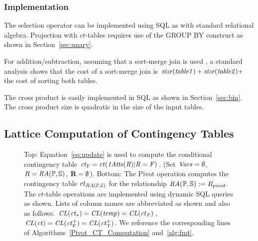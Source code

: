 \documentclass{acm_proc_article-sp}
\newcommand{\ct}{\mathit{ct}}
\begin{document}
\subsubsection{Implementation}\label{sec:imp}


The selection operator can be implemented  using SQL as with standard relational algebra. 
Projection with $\ct$-tables requires use of the GROUP BY construct as shown in Section~\ref{sec:unary}. 

For addition/subtraction, assuming that a sort-merge join is used \cite{Ullman1982}, a standard analysis shows that the cost of a sort-merge join is $\it{size}(table1) + \it{size}(table2) +$ the cost of sorting both tables. 

The cross product is easily implemented in SQL as shown in Section~\ref{sec:bin}. The cross product size is quadratic in the size of the input tables.


\subsection{Lattice Computation of Contingency Tables} \label{sec:mobius}
\begin{figure}[tb]
\begin{center}

\caption{Top: Equation~\eqref{eq:update} is used to compute the conditional contingency table $\ct_{\false} = \ct(\eatts(R)|R = F)$. (Set $\it{Vars} = \emptyset$, $R = \mathit{RA}(\mathbb{P},\mathbb{S})$, $\mathbf{R} = \emptyset$). Bottom: 
The Pivot operation computes the contingency table $\ct_{\ra(\P,\S)}$ for the relationship $\mathit{RA}(\mathbb{P},\mathbb{S}) := R_{pivot}$. The $\ct$-table operations are implemented using dynamic SQL queries as shown. Lists of column names are abbreviated as shown and also as follows.
$\ColumnList({\ct_{*}}) = \ColumnList({temp})=\ColumnList({\ct_{F}})$, 
$\ColumnList({\ct}) =  \ColumnList(\ct_{\false}^{+})  = \ColumnList(\ct_{\true}^{+}) $. We reference the corresponding lines of Algorithms~\ref{Pivot_CT_Computation} and~\ref{alg:fmt}.
\label{fig:flow}}
\end{center}
\end{figure}
\end{document}
